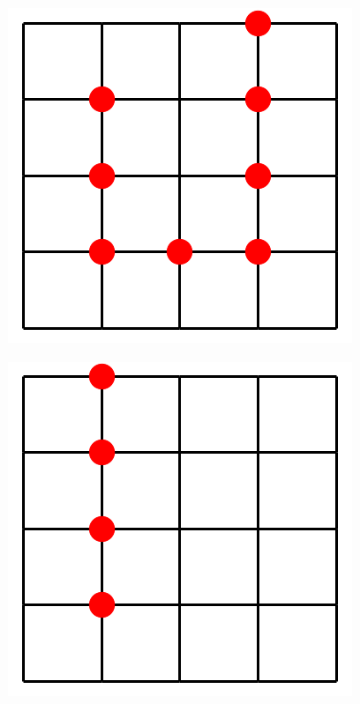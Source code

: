 \documentclass[a4paper]{article}
\begin{document}
\begin{figure}[ht]
\begin{subfigure}[b]{0.2\linewidth}
    \includegraphics[width=0.75\linewidth]{figures/maze_5x5_6.png} 
    \caption{} 
    \vspace{4ex}
  \end{subfigure}%
    \begin{subfigure}[b]{0.2\linewidth}
    \centering
    \includegraphics[width=0.75\linewidth]{figures/maze_5x5_7.png} 
    \caption{} 
    \vspace{4ex}
  \end{subfigure}%
    \begin{subfigure}[b]{0.2\linewidth}
    \centering

\end{subfigure}
\end{figure}
\end{document}
